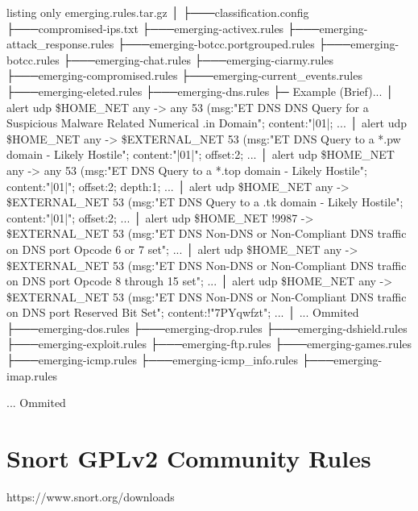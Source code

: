 \begin{tcblisting}{listing only}
emerging.rules.tar.gz
│
├───classification.config
├───compromised-ips.txt
├───emerging-activex.rules
├───emerging-attack_response.rules
├───emerging-botcc.portgrouped.rules
├───emerging-botcc.rules
├───emerging-chat.rules
├───emerging-ciarmy.rules
├───emerging-compromised.rules
├───emerging-current_events.rules
├───emerging-eleted.rules
├───emerging-dns.rules
    ├─ Example (Brief)...
      │ alert udp \$HOME_NET any -> any 53 (msg:"ET DNS DNS Query for a Suspicious Malware Related Numerical .in Domain"; content:"|01|; ...
      │ alert udp \$HOME_NET any -> \$EXTERNAL_NET 53 (msg:"ET DNS Query to a *.pw domain - Likely Hostile"; content:"|01|"; offset:2; ...
      │ alert udp \$HOME_NET any -> any 53 (msg:"ET DNS Query to a *.top domain - Likely Hostile"; content:"|01|"; offset:2; depth:1; ...
      │ alert udp \$HOME_NET any -> \$EXTERNAL_NET 53 (msg:"ET DNS Query to a .tk domain - Likely Hostile"; content:"|01|"; offset:2; ...
      │ alert udp \$HOME_NET !9987 -> \$EXTERNAL_NET 53 (msg:"ET DNS Non-DNS or Non-Compliant DNS traffic on DNS port Opcode 6 or 7 set"; ...
      │ alert udp \$HOME_NET any -> \$EXTERNAL_NET 53 (msg:"ET DNS Non-DNS or Non-Compliant DNS traffic on DNS port Opcode 8 through 15 set"; ...
      │ alert udp \$HOME_NET any -> \$EXTERNAL_NET 53 (msg:"ET DNS Non-DNS or Non-Compliant DNS traffic on DNS port Reserved Bit Set"; content:!"7PYqwfzt"; ...
      │ ... Ommited
├───emerging-dos.rules
├───emerging-drop.rules
├───emerging-dshield.rules
├───emerging-exploit.rules
├───emerging-ftp.rules
├───emerging-games.rules
├───emerging-icmp.rules
├───emerging-icmp_info.rules
├───emerging-imap.rules

... Ommited
\end{tcblisting}


\section{Snort GPLv2 Community Rules}
https://www.snort.org/downloads

